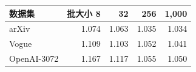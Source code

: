 \begin{tabular}{@{}lrrrr@{}}
\toprule
数据集 & 批大小 8 & 32 & 256 & 1,000 \\
\midrule
arXiv & 1.074 & 1.063 & 1.035 & 1.034 \\
Vogue & 1.109 & 1.103 & 1.052 & 1.041 \\
OpenAI-3072 & 1.167 & 1.117 & 1.055 & 1.050 \\
\bottomrule
\end{tabular}
